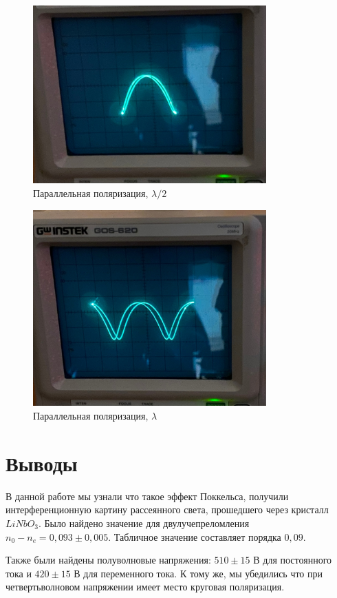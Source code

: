 \documentclass[a4paper, 12pt]{article}
\begin{document}
\begin{figure}[H]
    \centering
    \includegraphics[width=0.8\textwidth]{i1}
    \caption{Параллельная поляризация, $\lambda/2$}
    \label{fig:i1}
\end{figure}

\begin{figure}[H]
    \centering
    \includegraphics[width=0.8\textwidth]{i2}
    \caption{Параллельная поляризация, $\lambda$}
    \label{fig:i2}
\end{figure}

\section{Выводы}
В данной работе мы узнали что такое эффект Поккельса, получили интерференционную картину рассеянного света, прошедшего через кристалл $LiNbO_3$.
Было найдено значение для двулучепреломления $n_0 - n_e = 0,093 \pm 0,005$. Табличное значение составляет порядка $0,09$. 

Также были найдены полуволновые напряжения: $510 \pm 15$ В для постоянного тока и $420 \pm 15$ В для переменного тока. К тому же, мы убедились что при четвертьволновом напряжении имеет место круговая поляризация.
\end{document}
